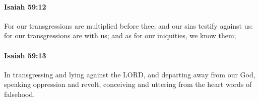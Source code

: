 		\paragraph{Isaiah 59:12} %
			\label{ISAIAH-59-12}

			For our transgressions are multiplied before thee, and our sins testify against us: for our transgressions are with us; and as for our iniquities, we know them;


		\paragraph{Isaiah 59:13} %
			\label{ISAIAH-59-13}

			In transgressing and lying against the LORD, and departing away from our God, speaking oppression and revolt, conceiving and uttering from the heart words of falsehood.


